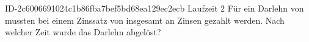 \begin{exercise}
      {ID-2c6006691024c1b86fba7bef5bd68ea129ec2ecb}
      {Laufzeit 2}
  \ifproblem\problem
    Für ein Darlehn von  mussten bei einem Zinssatz von 
    insgesamt  an Zinsen gezahlt werden. Nach welcher Zeit wurde
    das Darlehn abgelöst?
  \fi
\end{exercise}
